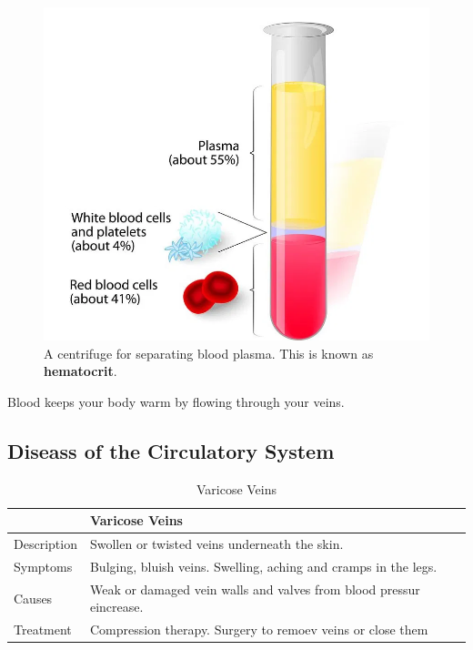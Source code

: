 \documentclass[12pt]{report}
\begin{document}
\begin{figure}[H]
\centering
    \includegraphics[width=0.5 \textwidth ]{../figures/hematocrit.png}
    \caption{A centrifuge for separating blood plasma. This is known as \textbf{hematocrit}.}
    \label{fig:hematocrit}
\end{figure}

\begin{note}{ }
    Blood keeps your body warm by flowing through your veins.
\end{note}

\subsection{Diseass of the Circulatory System}
\begin{table}
    \renewcommand{\arraystretch}{1.5}
    \setlength{\tabcolsep}{10pt}
    \setlength{\arrayrulewidth}{0.25mm}

    \begin{center}
        \vspace{0.5em}
        \begin{tabular}{|l|l|}
        \hline
         & Varicose Veins \\ 
        \hline
        Description & Swollen or twisted veins underneath the skin. \\
        \hline
        Symptoms & Bulging, bluish veins. Swelling, aching and cramps in the legs.\\ 
        \hline 
        Causes & Weak or damaged vein walls and valves from blood pressur eincrease. \\ 
        \hline 
        Treatment & Compression therapy. Surgery to remoev veins or close them\\ 
        \hline
        \end{tabular}
        \caption{Varicose Veins}
    \end{center}
\end{table}
\end{document}
